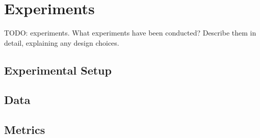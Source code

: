 \chapter{Experiments}\label{chap:experiments}

TODO: experiments. What experiments have been conducted? Describe them in detail, explaining any design choices.

\section{Experimental Setup}\label{sec:experimental-setup}

\section{Data}\label{sec:data}

\section{Metrics}\label{sec:metrics}


